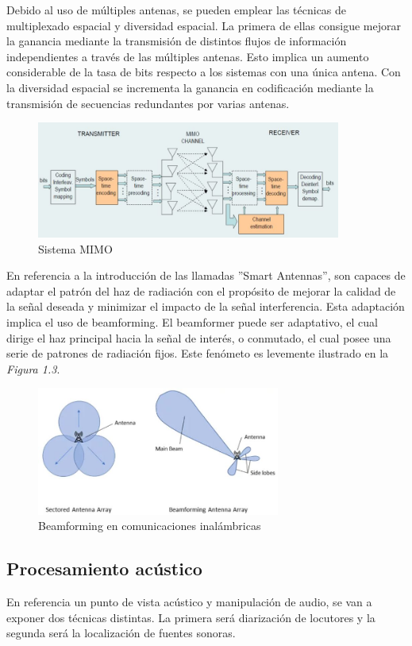 \documentclass[a4paper,11pt]{book}
\begin{document}
		Debido al uso de múltiples antenas, se pueden emplear las técnicas de multiplexado espacial y diversidad espacial. La primera de ellas consigue mejorar la ganancia mediante la transmisión de distintos flujos de información independientes a través de las múltiples antenas. Esto implica un aumento considerable de la tasa de bits respecto a los sistemas con una única antena. Con la diversidad espacial se incrementa la ganancia en codificación mediante la transmisión de secuencias redundantes por varias antenas.
		
		\begin{figure}[hbtp]
		\centering
		\includegraphics[width = 10cm]{FIGURAS/sistema_MIMO.JPG}
		\caption{Sistema MIMO}
		\end{figure}

		En referencia a la introducción de las llamadas ''Smart Antennas'', son capaces de adaptar el patrón del haz de radiación con el propósito de mejorar la calidad de la señal deseada y minimizar el impacto de la señal interferencia. Esta adaptación implica el uso de beamforming. El beamformer puede ser adaptativo, el cual dirige el haz principal hacia la señal de interés, o conmutado, el cual posee una serie de patrones de radiación fijos. Este fenómeto es levemente ilustrado en la \textit{Figura 1.3}.
		\begin{figure}[hbtp]
		\centering
		\includegraphics[width = 8cm]{FIGURAS/beamformer_adaptativo.JPG}
		\caption{Beamforming en comunicaciones inalámbricas}
		\end{figure}
		
		\subsection{Procesamiento acústico}
		En referencia un punto de vista acústico y manipulación de audio, se van a exponer dos técnicas distintas. La primera será diarización de locutores y la segunda será la localización de fuentes sonoras.
\end{document}
